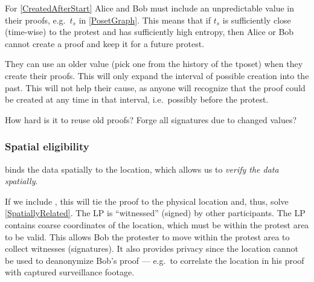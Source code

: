 For \cref{CreatedAfterStart} Alice and Bob must include an unpredictable value 
in their proofs, e.g.\ \(t_s\) in \cref{PosetGraph}.
This means that if \(t_s\) is sufficiently close (time-wise) to the protest and 
has sufficiently high entropy, then Alice or Bob cannot create a proof and keep 
it for a future protest.

They can use an older value (pick one from the history of the \ac{tposet}) when 
they create their proofs.
This will only expand the interval of possible creation into the past.
This will not help their cause, as anyone will recognize that the proof could 
be created at any time in that interval, i.e.\ possibly before the protest.

\begin{question}
  How hard is it to reuse old proofs?
  Forge all signatures due to changed values?
\end{question}

\subsubsection{Spatial eligibility}

 binds the data spatially to the location, which allows 
us to \emph{verify the data spatially}.

If we include , this will tie the proof to the physical location and, 
thus, solve \cref{SpatiallyRelated}.
The \ac{LP} is \enquote{witnessed} (signed) by other participants.
The \ac{LP} contains coarse coordinates of the location, which must be within 
the protest area to be valid.
This allows Bob the protester to move within the protest area to collect 
witnesses (signatures).
It also provides privacy since the location cannot be used to deanonymize Bob's 
proof --- e.g.\ to correlate the location in his proof with captured 
surveillance footage.


